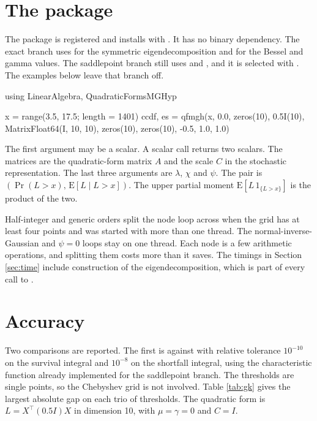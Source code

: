 \documentclass[article]{jss}
\begin{document}
\section[The package]{The  package} \label{sec:soft}

The package is registered and installs with .
It has no binary dependency.
The exact branch uses  for the symmetric eigendecomposition and  for the Bessel and gamma values.
The saddlepoint branch still uses  and , and it is selected with .
The examples below leave that branch off.

\begin{Code}
using LinearAlgebra, QuadraticFormsMGHyp

x = range(3.5, 17.5; length = 1401)
ccdf, es = qfmgh(x, 0.0, zeros(10), 0.5I(10), Matrix{Float64}(I, 10, 10),
    zeros(10), zeros(10), -0.5, 1.0, 1.0)
\end{Code}

The first argument may be a scalar.
A scalar call returns two scalars.
The matrices are the quadratic-form matrix $A$ and the scale $C$ in the stochastic representation.
The last three arguments are $\lambda$, $\chi$ and $\psi$.
The pair  is $(\Pr(L>x),\,\mathrm{E}[L\mid L>x])$.
The upper partial moment $\mathrm{E}[L\,1_{\{L>x\}}]$ is the product of the two.

Half-integer and generic orders split the node loop across  when the grid has at least four points and  was started with more than one thread.
The normal-inverse-Gaussian and $\psi=0$ loops stay on one thread.
Each node is a few arithmetic operations, and splitting them costs more than it saves.
The timings in Section \ref{sec:time} include construction of the eigendecomposition, which is part of every call to .

\section{Accuracy} \label{sec:acc}

Two comparisons are reported.
The first is against  with relative tolerance $10^{-10}$ on the survival integral and $10^{-8}$ on the shortfall integral, using the characteristic function already implemented for the saddlepoint branch.
The thresholds are single points, so the Chebyshev grid is not involved.
Table \ref{tab:gk} gives the largest absolute gap on each trio of thresholds.
The quadratic form is $L=X^\top(0.5I)X$ in dimension 10, with $\mu=\gamma=0$ and $C=I$.
\end{document}
